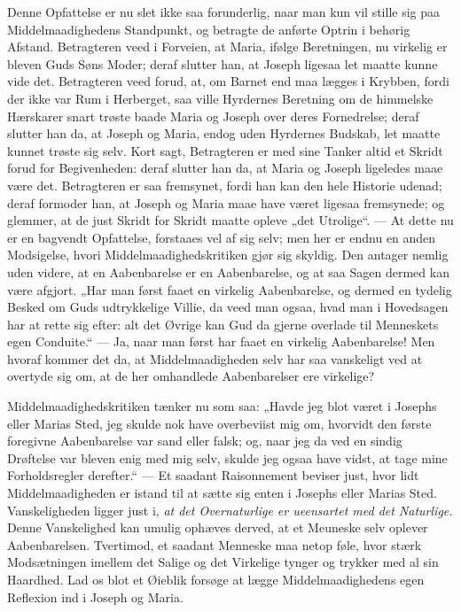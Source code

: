 \documentclass[12pt,a4paper]{book}
\begin{document}
Denne Opfattelse er nu slet ikke saa forunderlig, naar man kun vil stille sig paa
Middelmaadighedens Standpunkt, og betragte de anførte Optrin i behørig Afstand.
Betragteren veed i Forveien, at Maria, ifølge Beretningen, nu virkelig er bleven Guds
Søns Moder; deraf slutter han, at Joseph ligesaa let maatte kunne vide det.
Betragteren veed forud, at, om Barnet end maa lægges i Krybben, fordi der ikke var
Rum i Herberget, saa ville Hyrdernes Beretning om de himmelske Hærskarer snart trøste
baade Maria og Joseph over deres Fornedrelse; deraf slutter han da, at Joseph og
Maria, endog uden Hyrdernes Budskab, let maatte kunnet trøste sig selv. Kort sagt,
Betragteren er med sine Tanker altid et Skridt forud for Begivenheden: deraf slutter
han da, at Maria og Joseph ligeledes maae være det. Betragteren er saa fremsynet,
fordi han kan den hele Historie udenad; deraf formoder han, at Joseph
og Maria maae have været ligesaa fremsynede; og glemmer, at de just Skridt for Skridt
maatte opleve „det Utrolige“. --- At dette nu er en bagvendt Opfattelse, forstaaes vel
af sig selv; men her er endnu en anden Modsigelse, hvori Middelmaadighedskritiken gjør
sig skyldig. Den antager nemlig uden videre, at en Aabenbarelse er en Aabenbarelse, og
at saa Sagen dermed kan være afgjort. „Har man først faaet en virkelig Aabenbarelse,
og dermed en tydelig Besked om Guds udtrykkelige Villie, da veed man ogsaa, hvad man i
Hovedsagen har at rette sig efter: alt det Øvrige kan Gud da gjerne overlade til
Menneskets egen Conduite.“ --- Ja, naar man først har faaet en virkelig Aabenbarelse!
Men hvoraf kommer det da, at Middelmaadigheden selv har saa vanskeligt ved at overtyde
sig om, at de her omhandlede Aabenbarelser ere virkelige?

Middelmaadighedskritiken tænker nu som saa: „Havde jeg blot været i Josephs eller
Marias Sted, jeg skulde nok have overbeviist mig om, hvorvidt den første foregivne
Aabenbarelse var sand eller falsk; og, naar jeg da ved en sindig Drøftelse var bleven
enig med mig selv, skulde jeg ogsaa have vidst, at tage mine Forholdsregler
derefter.“ --- Et saadant Raisonnement beviser just, hvor lidt Middelmaadigheden er
istand til at sætte sig enten i Josephs eller Marias Sted. Vanskeligheden ligger just
i, \emph{at det Overnaturlige er ueensartet med det Naturlige.} Denne Vanskelighed kan
umulig ophæves derved, at et Meuneske selv oplever Aabenbarelsen. Tvertimod, et
saadant Menneske maa netop føle, hvor stærk Modsætningen imellem det Salige og det
Virkelige tynger og trykker med al sin Haardhed. Lad os blot et Øieblik forsøge at
lægge Middelmaadighedens egen Reflexion ind i Joseph og Maria.
\end{document}
